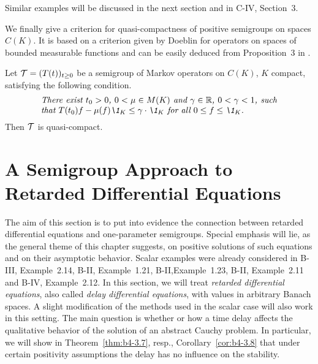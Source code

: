 Similar examples will be discussed in the next section and in  C-IV, Section~3.

We finally give a criterion for quasi-compactness of positive semigroups on spaces $C(K)$. 
It is based on a criterion given by Doeblin for operators on spaces of bounded measurable functions and can be easily deduced from  Proposition~3 in \citet{lotz:1981}.
\begin{proposition}\label{prop:b4-2.13}
%
%
	Let $\mathcal{T} = (T(t))_{t \geq 0}$ be a semigroup of Markov operators on $C(K)$, $K$ compact, satisfying the following condition.
\begin{equation*}\label{eq:b4-2.12}	
\begin{minipage}{.8\textwidth}
%	
\textit{There exist $t_{0} > 0$, $ 0 < \mu \in M(K)$ and  $\gamma \in \R$, $0 < \gamma < 1 $, 
such that  $T(t_{0})f - \mu(f)\1_K \leq \gamma \cdot \1_K$  for all   $0 \leq f \leq \1_K$.}
%
\end{minipage}
\end{equation*}
Then $\mathcal{T}$ is quasi-compact.
\end{proposition}


\section{A Semigroup Approach to Retarded Differential 
Equations}
\hspace{1cm}{\Large by Annette Grabosch und Ulrich Moustakas}
\vspace{.5cm}
\newline
The aim of this section is to put into evidence the connection between retarded differential equations and one-parameter semigroups.
Special emphasis will lie, as the general theme of this chapter suggests, on positive solutions of such equations and on their asymptotic behavior.
Scalar examples were already considered in B-III, Example~2.14, B-II, Example~1.21, B-II,Example~1.23, B-II, Example~2.11 and B-IV, Example~2.12.
In this section, we will treat \emph{retarded differential equations}, also called \emph{delay differential equations}, with values in arbitrary Banach spaces.
A slight modification of the methods used in the scalar case will also work in this setting.
The main question is whether or how a time delay affects the qualitative behavior of the solution of an abstract Cauchy problem.
In particular, we will show in Theorem~\ref{thm:b4-3.7}, resp., Corollary~\ref{cor:b4-3.8} that under certain positivity assumptions the delay has no influence on the stability.


